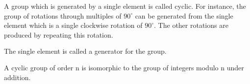 A group which is generated by a single element is called cyclic.
For instance, the group of rotations through multiples of $90^{\circ}$
can be generated from the single element which is a single clockwise rotation
of $90^{\circ}$. The other rotations are produced by repeating this rotation.
\par
The single element is called a generator for the group.
\par
A cyclic group of order n is isomorphic to the group of integers
modulo n under addition.